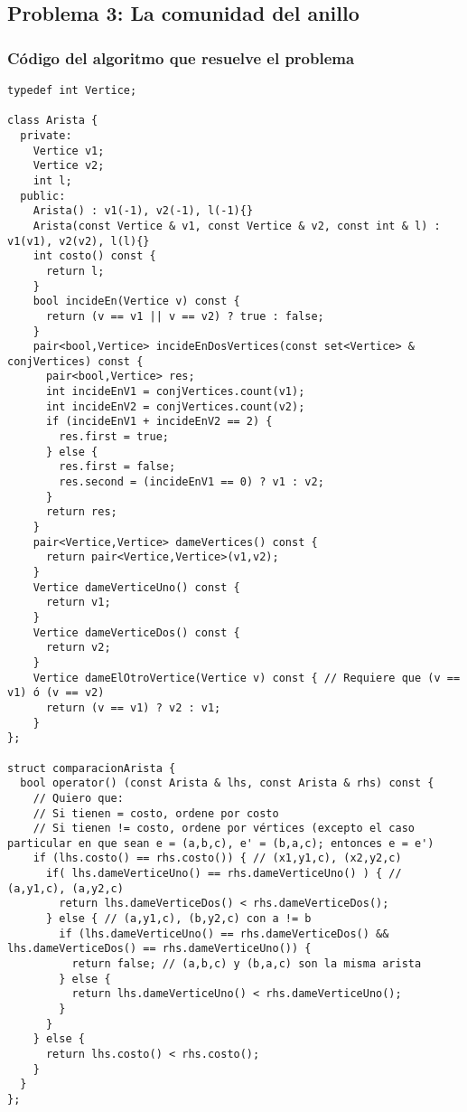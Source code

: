 \subsection{Problema 3: La comunidad del anillo}

\subsubsection{Código del algoritmo que resuelve el problema}
\begin{lstlisting}[frame=single]
typedef int Vertice;

class Arista {
  private:
    Vertice v1;
    Vertice v2;
    int l;
  public:
    Arista() : v1(-1), v2(-1), l(-1){}
    Arista(const Vertice & v1, const Vertice & v2, const int & l) : v1(v1), v2(v2), l(l){}
    int costo() const {
      return l;
    }
    bool incideEn(Vertice v) const {
      return (v == v1 || v == v2) ? true : false;
    }
    pair<bool,Vertice> incideEnDosVertices(const set<Vertice> & conjVertices) const {
      pair<bool,Vertice> res;
      int incideEnV1 = conjVertices.count(v1);
      int incideEnV2 = conjVertices.count(v2);
      if (incideEnV1 + incideEnV2 == 2) {
        res.first = true;
      } else {
        res.first = false;
        res.second = (incideEnV1 == 0) ? v1 : v2;
      }
      return res;
    }
    pair<Vertice,Vertice> dameVertices() const {
      return pair<Vertice,Vertice>(v1,v2);
    }
    Vertice dameVerticeUno() const {
      return v1;
    }
    Vertice dameVerticeDos() const {
      return v2;
    }
    Vertice dameElOtroVertice(Vertice v) const { // Requiere que (v == v1) ó (v == v2)
      return (v == v1) ? v2 : v1;
    }
};

struct comparacionArista {
  bool operator() (const Arista & lhs, const Arista & rhs) const {
    // Quiero que:
    // Si tienen = costo, ordene por costo
    // Si tienen != costo, ordene por vértices (excepto el caso particular en que sean e = (a,b,c), e' = (b,a,c); entonces e = e')
    if (lhs.costo() == rhs.costo()) { // (x1,y1,c), (x2,y2,c)
      if( lhs.dameVerticeUno() == rhs.dameVerticeUno() ) { // (a,y1,c), (a,y2,c)
        return lhs.dameVerticeDos() < rhs.dameVerticeDos();
      } else { // (a,y1,c), (b,y2,c) con a != b
        if (lhs.dameVerticeUno() == rhs.dameVerticeDos() && lhs.dameVerticeDos() == rhs.dameVerticeUno()) {
          return false; // (a,b,c) y (b,a,c) son la misma arista
        } else {
          return lhs.dameVerticeUno() < rhs.dameVerticeUno();
        }
      }
    } else {
      return lhs.costo() < rhs.costo();
    }
  }
};


\end{lstlisting}

